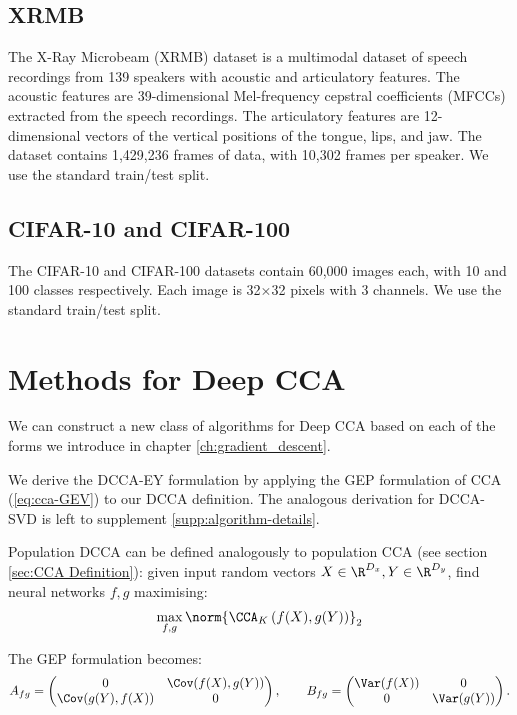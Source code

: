\subsection{XRMB}
The X-Ray Microbeam (XRMB) dataset \cite{westbury1994x} is a multimodal dataset of speech recordings from 139 speakers with acoustic and articulatory features. The acoustic features are 39-dimensional Mel-frequency cepstral coefficients (MFCCs) extracted from the speech recordings. The articulatory features are 12-dimensional vectors of the vertical positions of the tongue, lips, and jaw. The dataset contains 1,429,236 frames of data, with 10,302 frames per speaker. We use the standard train/test split.

\subsection{CIFAR-10 and CIFAR-100}
The CIFAR-10 and CIFAR-100 datasets contain 60,000 images each, with 10 and 100 classes respectively. Each image is 32$\times$32 pixels with 3 channels. We use the standard train/test split.


\section{Methods for Deep CCA}

We can construct a new class of algorithms for Deep CCA based on each of the forms we introduce in chapter \ref{ch:gradient_descent}.

We derive the DCCA-EY formulation by applying the GEP formulation of CCA (\ref{eq:cca-GEV}) to our DCCA definition. The analogous derivation for DCCA-SVD is left to supplement \ref{supp:algorithm-details}. 

Population DCCA \cite{andrew2013deep} can be defined analogously to population CCA (see section \ref{sec:CCA Definition}):
given input random vectors $X \in \R^{D_x}, Y \in \R^{D_y}$, find neural networks $f,g$ maximising:
\begin{align}\label{eq:DCCA-Andrew}
    \max_{f,g}  \norm{\CCA_K\left(f(X),g(Y)\right)}_2
\end{align}

The GEP formulation becomes:
\begin{equation*}
    A_{fg} = \begin{pmatrix} 0 &\Cov(f(X),g(Y)) \\ \Cov(g(Y),f(X)) & 0 \end{pmatrix}, \qquad
	B_{fg} = \begin{pmatrix}\Var(f(X)) & 0 \\ 0 & \Var(g(Y)) \end{pmatrix}.
\end{equation*}

